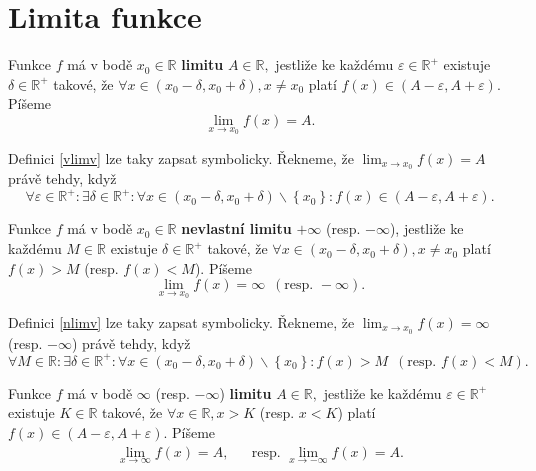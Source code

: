 \section{Limita funkce}\label{limita}
\begin{definition}\label{vlimv}
    Funkce $f$ má v bodě $x_0\in \mathbb R$ \textbf{limitu} $A\in \mathbb R,$
    jestliže ke každému $\varepsilon \in \mathbb R^+$ existuje
    $\delta \in \mathbb R^+$ takové, že $\forall x \in
    \left ( x_0-\delta, x_0+\delta \right ), x\ne x_0 $ platí $f(x)\in
    \left ( A-\varepsilon,A+\varepsilon \right ). $ Píšeme
    $$\lim_{x\to x_0}f(x)=A.$$
\end{definition}

\begin{pozn}
    Definici \ref{vlimv} lze taky zapsat symbolicky. Řekneme, že
    $\lim_{x\to x_0} f(x) =A$ právě tehdy, když
    $$
    \forall \varepsilon \in \mathbb R^+:
        \exists \delta \in \mathbb R^+: \forall x \in
        \left ( x_0-\delta,x_0+\delta \right )\smallsetminus\left \{ x_0 \right \}:
        f(x) \in \left ( A-\varepsilon, A+\varepsilon \right ).
    $$
\end{pozn}

\begin{definition}\label{nlimv}
Funkce $f$ má v bodě $x_0\in \mathbb R$ \textbf{nevlastní limitu} $+\infty$ (resp.
$-\infty$),
jestliže ke každému $M \in \mathbb R$ existuje
$\delta \in \mathbb R^+$ takové, že $\forall x \in
\left ( x_0-\delta, x_0+\delta \right ), x\ne x_0 $ platí $f(x)>M $
(resp. $f(x)<M$). Píšeme
$$\lim_{x\to x_0}f(x)=\infty \,\,\,(\textrm{resp. } -\infty).$$
\end{definition}

\begin{pozn}
    Definici \ref{nlimv} lze taky zapsat symbolicky. Řekneme, že
    $\lim_{x\to x_0} f(x) =\infty$ (resp. $-\infty$) právě tehdy, když
    $$
    \forall M \in \mathbb R:
        \exists \delta \in \mathbb R^+: \forall x \in
        \left ( x_0-\delta,x_0+\delta \right )\smallsetminus\left \{ x_0 \right \}:
        f(x) > M\,\,\, (\textrm{resp. } f(x) < M) .
    $$
\end{pozn}

\begin{definition}\label{vlimn}
Funkce $f$ má v bodě $\infty$ (resp. $-\infty$) \textbf{limitu} $A\in \mathbb R,$
jestliže ke každému $\varepsilon \in \mathbb R^+$ existuje
$K \in \mathbb R$ takové, že $\forall x \in \mathbb R, x > K$ (resp. $x<K$)
platí $f(x)\in \left ( A-\varepsilon,A+\varepsilon \right ). $ Píšeme
\begin{align*}
\lim_{x\to \infty}f(x)=A, & & \textrm{resp. } \lim_{x\to -\infty}f(x)=A.
\end{align*}
\end{definition}


